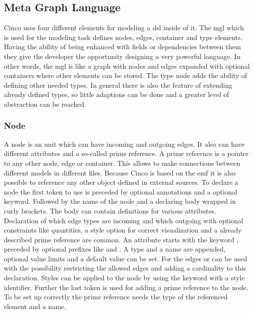 \subsection{Meta Graph Language}

Cinco uses four different elements for modeling a \gls{dsl} inside of it. The \gls{mgl} which is used for the modeling task defines nodes, edges, container and type elements. Having the ability of being enhanced with fields or dependencies between them they give the developer the opportunity designing a very powerful language. In other words, the \gls{mgl} is like a graph with nodes and edges expanded with optional containers where other elements can be stored. The type node adds the ability of defining other needed types. In general there is also the feature of extending already defined types, so little adaptions can be done and a greater level of abstraction can be reached.

\subsubsection{Node}

A node is an unit which can have incoming and outgoing edges. It also can have different attributes and a so-called prime reference. A prime reference is a pointer to any other node, edge or container. This allows to make connections between different models in different files. Because Cinco is based on the \gls{emf} it is also possible to reference any other object defined in external sources. To declare a node the first token to use is  preceded by optional annotations and a optional  keyword. Followed by the name of the node and a declaring body wrapped in curly brackets. The body can contain definitions for various attributes. Declaration of which edge types are incoming and which outgoing with optional constraints like quantities, a style option for correct visualization and a already described prime reference are common. An attribute starts with the keyword , preceded by optional prefixes like  and . A type and a name are appended, optional value limits and a default value can be set. For the edges  or  can be used with the possibility restricting the allowed edges and adding a cardinality to this declaration. Styles can be applied to the node by using the  keyword with a style identifier.
Further the last token  is used for adding a prime reference to the node. To be set up correctly the prime reference needs the type of the referenced element and a name.

